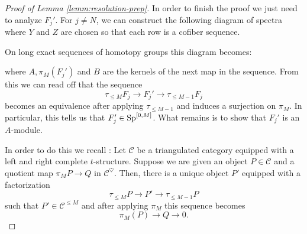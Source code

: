 \begin{proof}[Proof of Lemma \ref{lemm:resolution-prep}]
  In order to finish the proof we just need to analyze $F_j'$.
  For $j \neq N$, we can construct the following diagram of spectra where $Y$ and $Z$ are chosen so that each row is a cofiber sequence.
  \begin{center}
  \end{center}
  On long exact sequences of homotopy groups this diagram becomes:
  \begin{center}
  \end{center}
  where $A, \pi_{M}(F_j')$ and $B$ are the kernels of the next map in the sequence.
  From this we can read off that the sequence 
  $$ \tau_{\leq M}F_j \to F_j' \to \tau_{\leq M -1}F_j $$
  becomes an equivalence after applying $\tau_{\leq M-1}$ and induces a surjection on $\pi_M$.
  In particular, this tells us that $F_j' \in \operatorname{\mathrm{Sp}}^{[0,M]}$.
  What remains is to show that $F_j'$ is an $A$-module.

  In order to do this we recall \cite[Proposition 1.3.15]{BBDG}:
  Let $\mathcal{C}$ be a triangulated category equipped with a left and right complete $t$-structure.
  Suppose we are given an object $P \in \mathcal{C}$
  and a quotient map $\pi_MP \to Q$ in $\mathcal{C}^\heartsuit$.
  Then, there is a unique object $P'$ equipped with a factorization
  $$ \tau_{\leq M}P \to P' \to \tau_{\leq M-1}P $$
  such that $P' \in \mathcal{C}^{\leq M}$ and after applying $\pi_M$ this sequence becomes
  $$ \pi_M(P) \to Q \to 0. $$
  

\end{proof}
